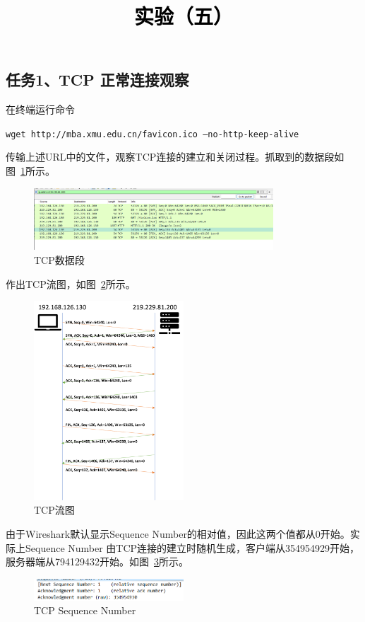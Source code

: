 \documentclass[a4paper,twoside]{article}
\newcommand{\PaperTitle}{实验（五）}  %
\begin{document}
\newpage

\title{
	\Large{\textcolor{black}{\PaperTitle}}
}
	
	
\maketitle
	
\tableofcontents
 
\newpage
\setcounter{page}{1}

\begin{spacing}{1.2}

\section{任务1、TCP 正常连接观察}

在终端运行命令
\begin{center}
	\texttt{wget http://mba.xmu.edu.cn/favicon.ico --no-http-keep-alive}
\end{center}
传输上述URL中的文件，观察TCP连接的建立和关闭过程。抓取到的数据段如图~\ref{fig:tcpp}所示。
\begin{figure}[htb]
	\centering
	\caption{TCP数据段}
	\label{fig:tcpp}
	\includegraphics[width=0.8\textwidth]{tcp_packs.png}
\end{figure}
作出TCP流图，如图~\ref{fig:tcpflow}所示。
\begin{figure}[htb]
	\centering
	\caption{TCP流图}
	\label{fig:tcpflow}
	\includegraphics[width=0.5\textwidth]{tcp.png}
\end{figure}
由于Wireshark默认显示Sequence Number的相对值，因此这两个值都从0开始。实际上Sequence Number
由TCP连接的建立时随机生成，客户端从354954929开始，服务器端从794129432开始。如图~\ref{fig:tcpseq}所示。
\begin{figure}[htb]
	\centering
	\caption{TCP Sequence Number}
	\label{fig:tcpseq}
	\includegraphics[width=0.5\textwidth]{realseq.png}
\end{figure}



\end{spacing}
\end{document}

